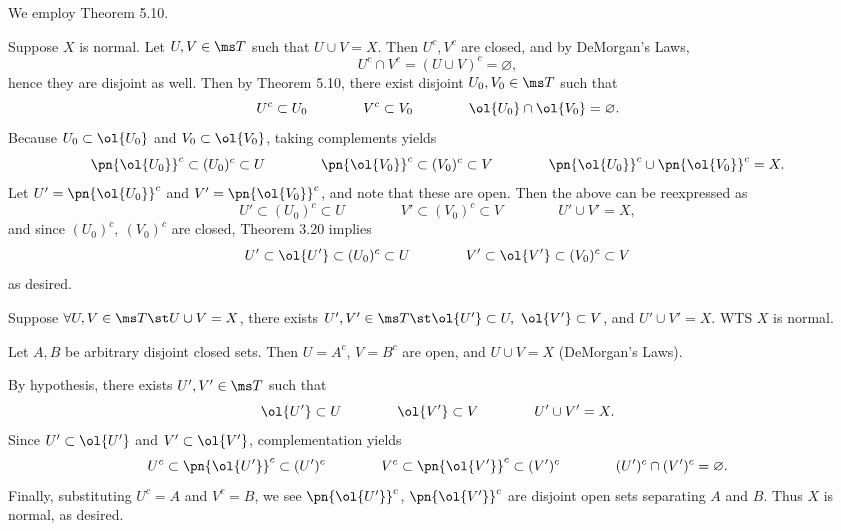 \documentclass{fkpset}
\begin{document}
  \begin{solution}[Solution 2:]
    We employ Theorem 5.10.
    \begin{iffproof}
      \item Suppose $X$ is normal. Let $U,V \in \ms T$ such that $U
        \cup V = X$. Then $U^c, V^c$ are closed, and by DeMorgan's
        Laws,
        \[
          U^c \cap V^c = (U \cup V)^c = \varnothing,
        \]
        hence they are disjoint as well. Then by Theorem 5.10, there
        exist disjoint $U_0, V_0 \in \ms T$ such that
        \[
          U^c \subset U_0\qquad\qquad V^c \subset V_0 \qquad\qquad
          \ol{U_0} \cap \ol{V_0} = \varnothing.
        \]
        Because $U_0 \subset \ol{U_0}$ and $V_0 \subset \ol{V_0}$,
        taking complements yields
        \[
          \pn{\ol{U_0}}^c \subset (U_0)^c \subset U \qquad\qquad
          \pn{\ol{V_0}}^c \subset (V_0)^c \subset V \qquad\qquad
          \pn{\ol{U_0}}^c \cup \pn{\ol{V_0}}^c
          = X.
        \]
        Let $U' = \pn{\ol{U_0}}^c$ and $V' =
        \pn{\ol{V_0}}^c$, and note that these are open. Then
        the above can be reexpressed as
        \[
          U' \subset (U_0)^c \subset U \qquad\qquad V' \subset (V_0)^c
          \subset V \qquad\qquad U' \cup V' = X,
        \]
        and since $(U_0)^c,\ (V_0)^c$ are closed, Theorem 3.20 implies
        \[
          U' \subset \ol{U'} \subset (U_0)^c \subset U \qquad\qquad
          V' \subset \ol{V'} \subset (V_0)^c \subset V
        \]
        as desired. \cmark
      \item Suppose $\forall U,V \in \ms T \st U\cup V = X$, there
        exists $U', V' \in \ms T \st \ol{U'} \subset U,\ \ol{V'}
        \subset V$, and $U' \cup V' = X$. WTS $X$ is normal.

        Let $A,B$ be arbitrary disjoint closed sets. Then $U=A^c$,
        $V=B^c$ are open, and $U\cup V = X$ (DeMorgan's Laws).

        By hypothesis, there exists $U',V' \in \ms T$ such that
        \[
          \ol{U'} \subset U \qquad \qquad \ol{V'} \subset V \qquad
          \qquad U' \cup V' = X.
        \]
        Since $U' \subset \ol{U'}$ and $V' \subset \ol{V'}$,
        complementation yields
        \[%
          U^c \subset \pn{\ol{U'}}^c \subset (U')^c
          \qquad\qquad V^c \subset \pn{\ol{V'}}^c \subset
          (V')^c \qquad\qquad (U')^c \cap (V')^c
          = \varnothing.
        \]
        Finally, substituting $U^c = A$ and $V^c = B$, we see
        $\pn{\ol{U'}}^c$, $\pn{\ol{V'}}^c$ are disjoint open
        sets separating $A$ and $B$. Thus $X$ is normal, as desired.
        \cmark
      \end{iffproof}
  \end{solution}
  \clearpage
\end{document}

